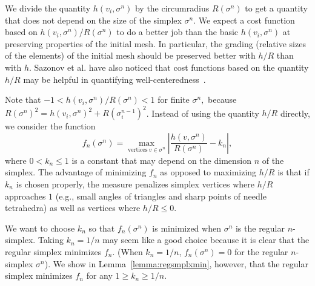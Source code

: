 \documentclass[final]{siamltex}
\begin{document}
We divide the quantity $h(v_{i}, \sigma^{n})$ by the circumradius
$R(\sigma^{n})$ to get a quantity that does not depend on the size of
the simplex $\sigma^{n}$.  We expect a cost function based on
$h(v_{i}, \sigma^{n})/R(\sigma^{n})$ to do a better job than the basic
$h(v_{i}, \sigma^{n})$ at preserving properties of the initial mesh.
In particular, the grading (relative sizes of the elements) of the
initial mesh should be preserved better with $h/R$ than with $h$.
Sazonov et al. have also noticed that cost functions based on the
quantity $h/R$ may be helpful in quantifying
well-centeredness~\cite{SaHaMoWe2006}.





Note that $-1 < h(v_{i}, \sigma^{n})/R(\sigma^{n}) < 1$ for finite
$\sigma^{n},$ because $R(\sigma^{n})^2 = h(v_{i}, \sigma^{n})^2 +
R(\sigma_{i}^{n-1})^2$.  Instead of using the quantity $h/R$ directly,
we consider the function
\[
f_{n}(\sigma^{n}) = \max_{\mathrm{vertices~}v \in \sigma^{n}}
    \left\lvert \frac{h(v, \sigma^{n})}{R(\sigma^{n})} - k_{n}\right\rvert,
\]
where $0 < k_{n} \le 1$ is a constant that may depend on the dimension
$n$ of the simplex.  The advantage of minimizing $f_{n}$ as opposed to
maximizing $h/R$ is that if $k_{n}$ is chosen properly, the measure
penalizes simplex vertices where $h/R$ approaches $1$ (e.g., small
angles of triangles and sharp points of needle tetrahedra) as well as
vertices where $h/R \le 0$.

We want to choose $k_{n}$ so that $f_{n}(\sigma^{n})$ is minimized
when $\sigma^{n}$ is the regular $n$-simplex.  Taking $k_{n} = 1/n$
may seem like a good choice because it is clear that the regular
simplex minimizes $f_{n}$.  (When $k_{n} =1/n$, $f_{n}(\sigma^{n}) =
0$ for the regular $n$-simplex $\sigma^{n}$).  We show in
Lemma~\ref{lemma:regsmplxmin}, however, that the regular simplex
minimizes $f_{n}$ for any $1 \ge k_{n} \ge 1/n$.

\bigskip
\end{document}
